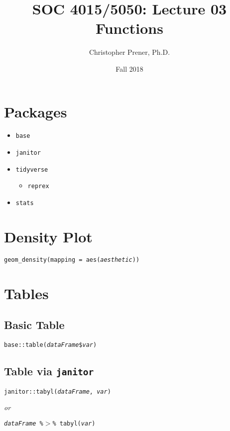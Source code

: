 \documentclass{tufte-handout}
\title{SOC 4015/5050: Lecture 03 Functions}
\author{Christopher Prener, Ph.D.}
\date{Fall 2018}
\newenvironment{subs}
  {\adjustwidth{3em}{0pt}}
  {\endadjustwidth}
\begin{document}
\maketitle %

\vspace{5mm}
\section{Packages}
\begin{itemize}
\item \texttt{base}
\item \texttt{janitor}
\item \texttt{tidyverse}
\begin{itemize}
\item \texttt{reprex}
\end{itemize}
\item \texttt{stats}
\end{itemize}

\vspace{5mm}
\section{Density Plot}
{\color{red}\texttt{geom\_density}}\texttt{(mapping = aes(\textit{aesthetic}))}


\vspace{5mm}
\section{Tables}
\begin{subs}
\subsection{Basic Table}
\texttt{base::}{\color{red}\texttt{table}}\texttt{(\textit{dataFrame}\$\textit{var})}

\vspace{3mm}
\subsection{Table via \texttt{janitor}}
\texttt{janitor::}{\color{red}\texttt{tabyl}}\texttt{(\textit{dataFrame}, \textit{var})}
\par \noindent \textit{or}
\par \noindent \texttt{\textit{dataFrame} \%$>$\% {\color{red}\texttt{tabyl}}\texttt{(\textit{var})}}
\end{subs}
\end{document}

